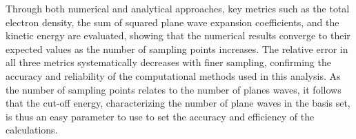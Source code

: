 Through both numerical and analytical approaches, key metrics such as the total electron density, the sum of squared plane wave expansion coefficients, and the kinetic energy are evaluated, showing that the numerical results converge to their expected values as the number of sampling points increases. The relative error in all three metrics systematically decreases with finer sampling, confirming the accuracy and reliability of the computational methods used in this analysis. As the number of sampling points relates to the number of planes waves, it follows that the cut-off energy, characterizing the number of plane waves in the basis set, is thus an easy parameter to use to set the accuracy and efficiency of the calculations.
